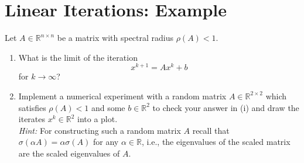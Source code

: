\section{Linear Iterations: Example}

Let $A \in \mathbb{R}^{n \times n}$ be a matrix with spectral radius $\rho(A) < 1$.
	\begin{enumerate}
		\item What is the limit of the iteration
		$$
			x^{k+1} = A x^k +b
		$$
		for $k \rightarrow \infty$?
		
		\item Implement a numerical experiment with a random matrix $A \in \mathbb{R}^{2 \times 2}$ which satisfies $\rho(A)<1$ and some $b\in \mathbb{R}^2$ to check your answer in (i) and draw the iterates $x^k \in \mathbb{R}^2$ into a plot.\\[0.1cm]
				\textit{Hint:} For constructing such a random matrix $A$ recall that $\sigma(\alpha A) = \alpha \sigma(A)$ for any $\alpha \in \mathbb{R}$, i.e., the eigenvalues of the scaled matrix are the scaled eigenvalues of $A$.
	\end{enumerate}
